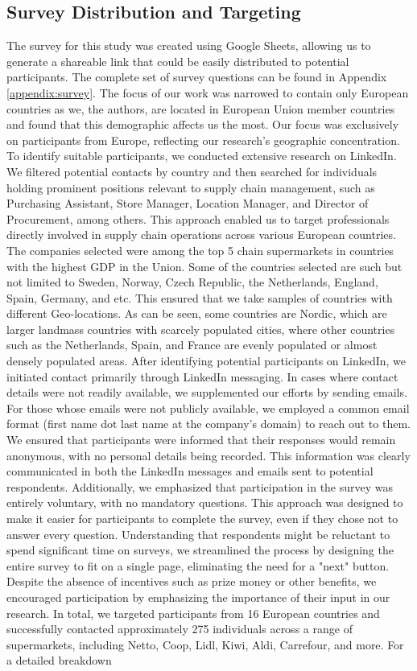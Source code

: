 \subsection{Survey Distribution and Targeting}

The survey for this study was created using Google Sheets, allowing us to generate a shareable link that could be easily distributed to potential participants. The complete set of survey questions can be found in Appendix \ref{appendix:survey}. The focus of our work was narrowed to contain only European countries as we, the authors, are located in European Union member countries and found that this demographic affects us the most. Our focus was exclusively on participants from Europe, reflecting our research's geographic concentration. To identify suitable participants, we conducted extensive research on LinkedIn. We filtered potential contacts by country and then searched for individuals holding prominent positions relevant to supply chain management, such as Purchasing Assistant, Store Manager, Location Manager, and Director of Procurement, among others. This approach enabled us to target professionals directly involved in supply chain operations across various European countries. The companies selected were among the top 5 chain supermarkets in countries with the highest GDP in the Union. Some of the countries selected are such but not limited to Sweden, Norway, Czech Republic, the Netherlands, England, Spain, Germany, and etc. This ensured that we take samples of countries with different Geo-locations. As can be seen, some countries are Nordic, which are larger landmass countries with scarcely populated cities, where other countries such as the Netherlands, Spain, and France are evenly populated or almost densely populated areas. After identifying potential participants on LinkedIn, we initiated contact primarily through LinkedIn messaging. In cases where contact details were not readily available, we supplemented our efforts by sending emails. For those whose emails were not publicly available, we employed a common email format (first name dot last name at the company's domain) to reach out to them. We ensured that participants were informed that their responses would remain anonymous, with no personal details being recorded. This information was clearly communicated in both the LinkedIn messages and emails sent to potential respondents. Additionally, we emphasized that participation in the survey was entirely voluntary, with no mandatory questions. This approach was designed to make it easier for participants to complete the survey, even if they chose not to answer every question. Understanding that respondents might be reluctant to spend significant time on surveys, we streamlined the process by designing the entire survey to fit on a single page, eliminating the need for a "next" button. Despite the absence of incentives such as prize money or other benefits, we encouraged participation by emphasizing the importance of their input in our research. In total, we targeted participants from 16 European countries and successfully contacted approximately 275 individuals across a range of supermarkets, including Netto, Coop, Lidl, Kiwi, Aldi, Carrefour, and more. For a detailed breakdown 